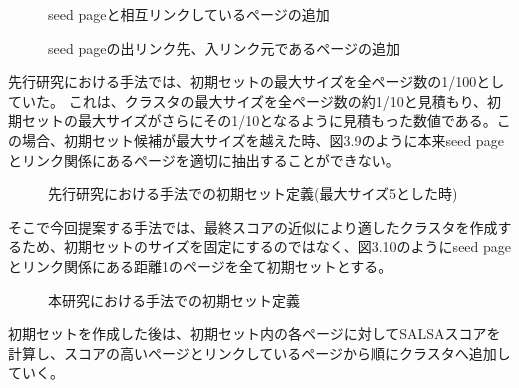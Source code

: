 \documentclass[a4paper,11pt]{jreport}
\begin{document}
\begin{figure}[htbp]
\begin{center}
\end{center}
\caption{seed pageと相互リンクしているページの追加}
\label{figure:sample}
\end{figure}

\begin{figure}[htbp]
\begin{center}
\end{center}
\caption{seed pageの出リンク先、入リンク元であるページの追加}
\label{figure:sample}
\end{figure}

\newpage

先行研究における手法では、初期セットの最大サイズを全ページ数の1/100としていた。
これは、クラスタの最大サイズを全ページ数の約1/10と見積もり、初期セットの最大サイズがさらにその1/10となるように見積もった数値である。この場合、初期セット候補が最大サイズを越えた時、図3.9のように本来seed pageとリンク関係にあるページを適切に抽出することができない。

\begin{figure}[htbp]
\begin{center}
\end{center}
\caption{先行研究における手法での初期セット定義(最大サイズ5とした時)}
\label{figure:sample}
\end{figure}

そこで今回提案する手法では、最終スコアの近似により適したクラスタを作成するため、初期セットのサイズを固定にするのではなく、図3.10のようにseed pageとリンク関係にある距離1のページを全て初期セットとする。

\begin{figure}[htbp]
\begin{center}
\end{center}
\caption{本研究における手法での初期セット定義}
\label{figure:sample}
\end{figure}

\newpage

初期セットを作成した後は、初期セット内の各ページに対してSALSAスコアを計算し、スコアの高いページとリンクしているページから順にクラスタへ追加していく。
\end{document}
